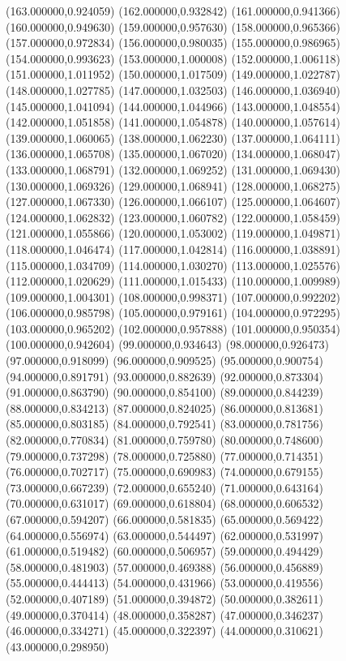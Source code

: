 {(163.000000,0.924059)
(162.000000,0.932842)
(161.000000,0.941366)
(160.000000,0.949630)
(159.000000,0.957630)
(158.000000,0.965366)
(157.000000,0.972834)
(156.000000,0.980035)
(155.000000,0.986965)
(154.000000,0.993623)
(153.000000,1.000008)
(152.000000,1.006118)
(151.000000,1.011952)
(150.000000,1.017509)
(149.000000,1.022787)
(148.000000,1.027785)
(147.000000,1.032503)
(146.000000,1.036940)
(145.000000,1.041094)
(144.000000,1.044966)
(143.000000,1.048554)
(142.000000,1.051858)
(141.000000,1.054878)
(140.000000,1.057614)
(139.000000,1.060065)
(138.000000,1.062230)
(137.000000,1.064111)
(136.000000,1.065708)
(135.000000,1.067020)
(134.000000,1.068047)
(133.000000,1.068791)
(132.000000,1.069252)
(131.000000,1.069430)
(130.000000,1.069326)
(129.000000,1.068941)
(128.000000,1.068275)
(127.000000,1.067330)
(126.000000,1.066107)
(125.000000,1.064607)
(124.000000,1.062832)
(123.000000,1.060782)
(122.000000,1.058459)
(121.000000,1.055866)
(120.000000,1.053002)
(119.000000,1.049871)
(118.000000,1.046474)
(117.000000,1.042814)
(116.000000,1.038891)
(115.000000,1.034709)
(114.000000,1.030270)
(113.000000,1.025576)
(112.000000,1.020629)
(111.000000,1.015433)
(110.000000,1.009989)
(109.000000,1.004301)
(108.000000,0.998371)
(107.000000,0.992202)
(106.000000,0.985798)
(105.000000,0.979161)
(104.000000,0.972295)
(103.000000,0.965202)
(102.000000,0.957888)
(101.000000,0.950354)
(100.000000,0.942604)
(99.000000,0.934643)
(98.000000,0.926473)
(97.000000,0.918099)
(96.000000,0.909525)
(95.000000,0.900754)
(94.000000,0.891791)
(93.000000,0.882639)
(92.000000,0.873304)
(91.000000,0.863790)
(90.000000,0.854100)
(89.000000,0.844239)
(88.000000,0.834213)
(87.000000,0.824025)
(86.000000,0.813681)
(85.000000,0.803185)
(84.000000,0.792541)
(83.000000,0.781756)
(82.000000,0.770834)
(81.000000,0.759780)
(80.000000,0.748600)
(79.000000,0.737298)
(78.000000,0.725880)
(77.000000,0.714351)
(76.000000,0.702717)
(75.000000,0.690983)
(74.000000,0.679155)
(73.000000,0.667239)
(72.000000,0.655240)
(71.000000,0.643164)
(70.000000,0.631017)
(69.000000,0.618804)
(68.000000,0.606532)
(67.000000,0.594207)
(66.000000,0.581835)
(65.000000,0.569422)
(64.000000,0.556974)
(63.000000,0.544497)
(62.000000,0.531997)
(61.000000,0.519482)
(60.000000,0.506957)
(59.000000,0.494429)
(58.000000,0.481903)
(57.000000,0.469388)
(56.000000,0.456889)
(55.000000,0.444413)
(54.000000,0.431966)
(53.000000,0.419556)
(52.000000,0.407189)
(51.000000,0.394872)
(50.000000,0.382611)
(49.000000,0.370414)
(48.000000,0.358287)
(47.000000,0.346237)
(46.000000,0.334271)
(45.000000,0.322397)
(44.000000,0.310621)
(43.000000,0.298950)
}
